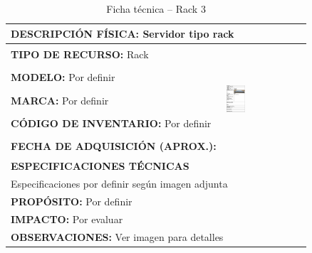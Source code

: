 \begin{table}[H]
\centering
\caption{Ficha técnica -- Rack 3}
\label{tab:rack-3}
\begin{tabular}{|p{}|p{}|}
\hline
\multicolumn{2}{|l|}{\textbf{DESCRIPCIÓN FÍSICA:} Servidor tipo rack} \\ \hline
\textbf{TIPO DE RECURSO:} Rack & 
\multirow{5}{*}{\includegraphics[width=0.25\textwidth,height=4cm,keepaspectratio]{tablas-images/cp1/racks/rack-3.png}} \\ \cline{1-1}
\textbf{MODELO:} Por definir & \\ \cline{1-1}
\textbf{MARCA:} Por definir & \\ \cline{1-1}
\textbf{CÓDIGO DE INVENTARIO:} Por definir & \\ \cline{1-1}
\textbf{FECHA DE ADQUISICIÓN (APROX.):} & \\ \hline
\multicolumn{2}{|l|}{\textbf{ESPECIFICACIONES TÉCNICAS}} \\ \hline
\multicolumn{2}{|p{0.95\textwidth}|}{
\footnotesize
Especificaciones por definir según imagen adjunta
} \\ \hline
\multicolumn{2}{|l|}{\textbf{PROPÓSITO:} Por definir} \\ \hline
\multicolumn{2}{|l|}{\textbf{IMPACTO:} Por evaluar} \\ \hline
\multicolumn{2}{|l|}{\textbf{OBSERVACIONES:} Ver imagen para detalles} \\ \hline
\end{tabular}
\end{table}

